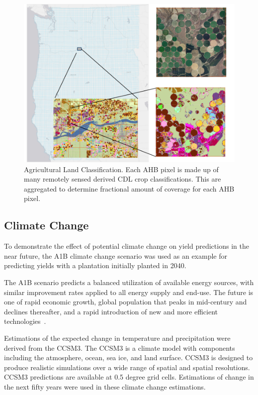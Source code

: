 \documentclass[preprint,12pt]{elsarticle}
\begin{document}
\begin{figure}[hp]
  \centering
  \includegraphics[width=1\linewidth]{land.png}
  \caption{Agricultural Land Classification.  Each \ac{AHB} pixel is made up of
    many remotely sensed derived \ac{CDL} crop classifications.  This
    are aggregated to determine fractional amount of coverage for each
    \ac{AHB} pixel. }
  \label{fig:land}
\end{figure}

\subsection{Climate Change}

To demonstrate the effect of potential climate change on yield
predictions in the near future, the A1B climate change scenario was
used as an example for predicting yields with a plantation initially
planted in 2040.

The A1B scenario predicts a balanced utilization of available energy
sources, with similar improvement rates applied to all energy supply
and end-use.  The future is one of rapid economic growth, global
population that peaks in mid-century and declines thereafter, and a
rapid introduction of new and more efficient
technologies~\cite{IPCC2007,Parry2007}.

Estimations of the expected change in temperature and precipitation
were derived from the \ac{CCSM3}.  The \ac{CCSM3} is a climate model
with components including the atmosphere, ocean, sea ice, and land
surface. \ac{CCSM3} is designed to produce realistic simulations over
a wide range of spatial and spatial resolutions.  \ac{CCSM3}
predictions are available at 0.5 degree grid cells.  Estimations of
change in the next fifty years were used in these climate change
estimations.
\end{document}

